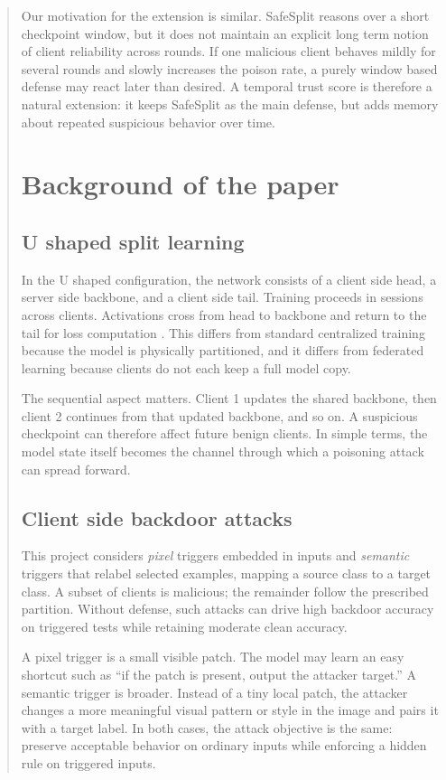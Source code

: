 \documentclass{article}
\begin{document}
\begin{abstract}
Our motivation for the extension is similar. SafeSplit reasons over a short checkpoint window, but it does not maintain an explicit long term notion of client reliability across rounds. If one malicious client behaves mildly for several rounds and slowly increases the poison rate, a purely window based defense may react later than desired. A temporal trust score is therefore a natural extension: it keeps SafeSplit as the main defense, but adds memory about repeated suspicious behavior over time.

\section{Background of the paper}
\label{sec:background}

\subsection{U shaped split learning}
\label{sec:ushaped}

In the U shaped configuration, the network consists of a client side head, a server side backbone, and a client side tail. Training proceeds in sessions across clients. Activations cross from head to backbone and return to the tail for loss computation \cite{safesplit2025}. This differs from standard centralized training because the model is physically partitioned, and it differs from federated learning because clients do not each keep a full model copy.

The sequential aspect matters. Client 1 updates the shared backbone, then client 2 continues from that updated backbone, and so on. A suspicious checkpoint can therefore affect future benign clients. In simple terms, the model state itself becomes the channel through which a poisoning attack can spread forward.

\subsection{Client side backdoor attacks}
\label{sec:attacks}

This project considers \emph{pixel} triggers embedded in inputs and \emph{semantic} triggers that relabel selected examples, mapping a source class to a target class. A subset of clients is malicious; the remainder follow the prescribed partition. Without defense, such attacks can drive high backdoor accuracy on triggered tests while retaining moderate clean accuracy.

A pixel trigger is a small visible patch. The model may learn an easy shortcut such as ``if the patch is present, output the attacker target.'' A semantic trigger is broader. Instead of a tiny local patch, the attacker changes a more meaningful visual pattern or style in the image and pairs it with a target label. In both cases, the attack objective is the same: preserve acceptable behavior on ordinary inputs while enforcing a hidden rule on triggered inputs.


\end{abstract}
\end{document}
